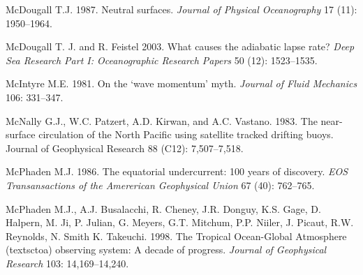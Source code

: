 \begin{thebibliography}{999}
McDougall T.J.  1987. Neutral surfaces. \textit{Journal of Physical
  Oceanography} 17 (11): 1950--1964.
%

McDougall T. J. and R. Feistel 2003. What causes the adiabatic lapse
rate? \textit{Deep Sea Research Part I: Oceanographic Research Papers}
50 (12): 1523--1535.
%

McIntyre M.E.  1981. On the `wave momentum' myth. \textit{Journal of
  Fluid Mechanics} 106: 331--347.
%

McNally G.J., W.C. Patzert, A.D. Kirwan, and A.C. Vastano. 1983. The
near-surface circulation of the North Pacific using satellite tracked
drifting buoys. Journal of Geophysical Research 88 (C12):
7,507--7,518.
%

McPhaden M.J.  1986. The equatorial undercurrent: 100 years of
discovery. \textit{EOS Transansactions of the Amererican Geophysical
  Union} 67 (40): 762--765.
%

McPhaden M.J., A.J. Busalacchi, R. Cheney, J.R. Donguy, K.S. Gage,
D. Halpern, M. Ji, P. Julian, G. Meyers, G.T. Mitchum, P.P. Niiler,
J. Picaut, R.W. Reynolds, N. Smith K. Takeuchi. 1998. The Tropical
Ocean-Global Atmosphere (textsc{toa}) observing system: A decade of
progress.  \textit{Journal of Geophysical Research} 103:
14,169--14,240.
%


\end{thebibliography}
